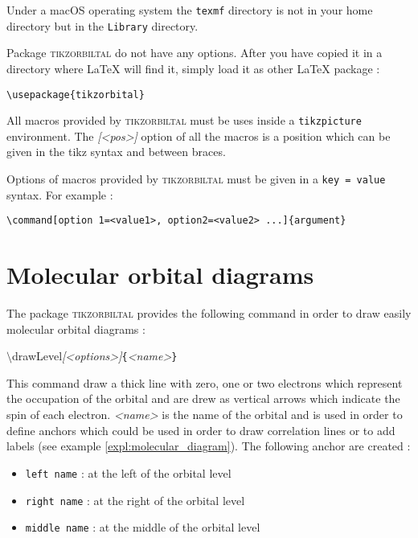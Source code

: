 \documentclass[10pt]{article}
\newcommand*{\cmd}[1]{{\ttfamily\color{blue!50!black}$\setminus$#1}\xspace}
\newcommand*{\opt}[1]{{\ttfamily\itshape\color{green!60!black}[<#1>]}\xspace}
\newcommand*{\marg}[1]{{\ttfamily\itshape\color{red!95!black}<#1>}\xspace}
\newcommand{\package}{\textsc{\sffamily\color{blue!50!black}tikzorbiltal}\xspace}
\begin{document}
Under a macOS operating system the \verb!texmf! directory is not in your home directory but in the \verb!Library! directory.

Package \package do not have any options. After you have copied it in a directory where \LaTeX{} will find it, simply load it as other \LaTeX{} package :

\begin{lstlisting}
\usepackage{tikzorbital}
\end{lstlisting}

All macros provided by \package must be uses inside a \texttt{tikzpicture} environment. The \opt{pos} option of all the macros is a position which can be given in the tikz syntax and between braces.

Options of macros provided by \package must be given in a \texttt{key = value} syntax. For example :
%
\begin{lstlisting}
\command[option 1=<value1>, option2=<value2> ...]{argument}
\end{lstlisting}

\section{Molecular orbital diagrams}

The package \package provides the following command in order to draw easily molecular orbital diagrams :

\cmd{drawLevel}\opt{options}\texttt{\{}\marg{name}\texttt{\}}

This command draw a thick line with zero, one or two electrons which represent the occupation of the orbital and are drew as vertical arrows which indicate the spin of each electron. \marg{name} is the name of the orbital and is used in order to define anchors which could be used in order to draw correlation lines or to add labels (see example \ref{expl:molecular_diagram}). The following anchor are created :

\begin{itemize}
    \item \texttt{left name} : at the left of the orbital level
    \item \texttt{right name} : at the right of the orbital level
    \item \texttt{middle name} : at the middle of the orbital level
\end{itemize}
\end{document}

